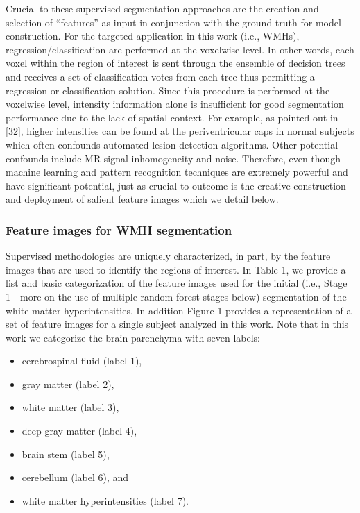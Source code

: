 \documentclass[11pt,]{article}
\providecommand{\tightlist}{%
  \setlength{\itemsep}{0pt}\setlength{\parskip}{0pt}}
\begin{document}
Crucial to these supervised segmentation approaches are the creation and
selection of ``features'' as input in conjunction with the ground-truth
for model construction. For the targeted application in this work (i.e.,
WMHs), regression/classification are performed at the voxelwise level.
In other words, each voxel within the region of interest is sent through
the ensemble of decision trees and receives a set of classification
votes from each tree thus permitting a regression or classification
solution. Since this procedure is performed at the voxelwise level,
intensity information alone is insufficient for good segmentation
performance due to the lack of spatial context. For example, as pointed
out in {[}32{]}, higher intensities can be found at the periventricular
caps in normal subjects which often confounds automated lesion detection
algorithms. Other potential confounds include MR signal inhomogeneity
and noise. Therefore, even though machine learning and pattern
recognition techniques are extremely powerful and have significant
potential, just as crucial to outcome is the creative construction and
deployment of salient feature images which we detail below.

\subsubsection{Feature images for WMH
segmentation}\label{feature-images-for-wmh-segmentation}



Supervised methodologies are uniquely characterized, in part, by the
feature images that are used to identify the regions of interest. In
Table 1, we provide a list and basic categorization of the feature
images used for the initial (i.e., Stage 1---more on the use of multiple
random forest stages below) segmentation of the white matter
hyperintensities. In addition Figure 1 provides a representation of a
set of feature images for a single subject analyzed in this work. Note
that in this work we categorize the brain parenchyma with seven labels:

\begin{itemize}
\tightlist
\item
  cerebrospinal fluid (label 1),
\item
  gray matter (label 2),
\item
  white matter (label 3),
\item
  deep gray matter (label 4),
\item
  brain stem (label 5),
\item
  cerebellum (label 6), and
\item
  white matter hyperintensities (label 7).
\end{itemize}
\end{document}
